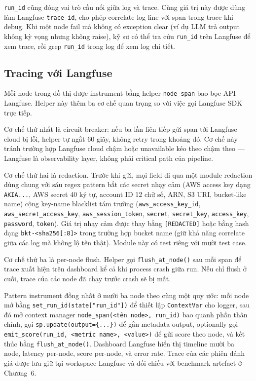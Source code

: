 \texttt{run\_id} cũng đóng vai trò cầu nối giữa log và trace. Cùng giá trị này được dùng làm Langfuse \texttt{trace\_id}, cho phép correlate log line với span trong trace khi debug. Khi một node fail mà không có exception clear (ví dụ LLM trả output không kỳ vọng nhưng không raise), kỹ sư có thể tra cứu \texttt{run\_id} trên Langfuse để xem trace, rồi grep \texttt{run\_id} trong log để xem log chi tiết.

\subsection{Tracing với Langfuse}
\label{sub:tracing}

Mỗi node trong đồ thị được instrument bằng helper \texttt{node\_span} bao bọc API Langfuse. Helper này thêm ba cơ chế quan trọng so với việc gọi Langfuse SDK trực tiếp.

Cơ chế thứ nhất là circuit breaker: nếu ba lần liên tiếp gửi span tới Langfuse cloud bị lỗi, helper tự ngắt 60 giây, không retry trong khoảng đó. Cơ chế này tránh trường hợp Langfuse cloud chậm hoặc unavailable kéo theo \sysnameshort{} chậm theo — Langfuse là observability layer, không phải critical path của pipeline.

Cơ chế thứ hai là redaction. Trước khi gửi, mọi field đi qua một module redaction dùng chung với sáu regex pattern bắt các secret nhạy cảm (AWS access key dạng \texttt{AKIA...}, AWS secret 40 ký tự, account ID 12 chữ số, ARN, S3 URI, bucket-like name) cộng key-name blacklist tám trường (\texttt{aws\_access\_key\_id}, \texttt{aws\_secret\_access\_key}, \texttt{aws\_session\_token}, \texttt{secret}, \texttt{secret\_key}, \texttt{access\_key}, \texttt{password}, \texttt{token}). Giá trị nhạy cảm được thay bằng \texttt{[REDACTED]} hoặc bằng hash dạng \texttt{bkt-<sha256[:8]>} trong trường hợp bucket name (giữ khả năng correlate giữa các log mà không lộ tên thật). Module này có test riêng với mười test case.

Cơ chế thứ ba là per-node flush. Helper gọi \texttt{flush\_at\_node()} sau mỗi span để trace xuất hiện trên dashboard kể cả khi process crash giữa run. Nếu chỉ flush ở cuối, trace của các node đã chạy trước crash sẽ bị mất.

Pattern instrument đồng nhất ở mười ba node theo cùng một quy ước: mỗi node mở bằng \texttt{set\_run\_id(state["run\_id"])} để thiết lập \texttt{ContextVar} cho logger, sau đó mở context manager \texttt{node\_span(<tên node>, run\_id)} bao quanh phần thân chính, gọi \texttt{sp.update(output=\{...\})} để gắn metadata output, optionally gọi \texttt{emit\_score(run\_id, <metric name>, <value>)} để gửi score theo node, và kết thúc bằng \texttt{flush\_at\_node()}. Dashboard Langfuse hiển thị timeline mười ba node, latency per-node, score per-node, và error rate. Trace của các phiên đánh giá được lưu giữ tại workspace Langfuse và đối chiếu với benchmark artefact ở Chương~6.

